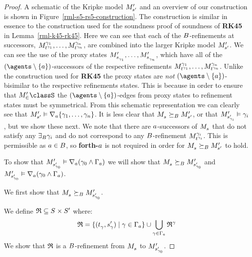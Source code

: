 \begin{proof}
A schematic of the Kripke model $\kPModelP{\kStateSP}$ and an overview of our construction is shown in Figure~\ref{rml-s5-rs5-construction}.
The construction is similar in essence to the construction used for the soundness proof of soundness of {\bf RK45} in Lemma~\ref{rml-k45-rk45}.
Here we can see that each of the $\agentsB$-refinements at successors, $\kPModel[\gamma_1]{\kStateT[\gamma_1]}, \dots, \kPModel[\gamma_n]{\kStateT[\gamma_n]}$, are combined into the larger Kripke model $\kPModelP{\kStateSP}$.
We can see the use of the proxy states $\kPModelP{\kStateS_{\gamma_1}}, \dots, \kPModelP{\kStateS_{\gamma_n}}$, which have all of the $(\agents \setminus \{\agentA\})$-successors of the respective refinements $\kPModel[\gamma_1]{\kStateT[\gamma_1]}, \dots, \kPModel[\gamma_n]{\kStateT[\gamma_n]}$.
Unlike the construction used for {\bf RK45} the proxy states are {\em not} $(\agents \setminus \{\agentA\})$-bisimilar to the respective refinements states.
This is because in order to ensure that $\kPModelP \in \classS$ the $(\agents \setminus \{\agentA\})$-edges from proxy states to refinement states must be symmetrical.
From this schematic representation we can clearly see that $\kPModelP{\kStateSP} \entails \coversA \{\gamma_1, \dots, \gamma_n\}$.
It is less clear that $\kPModel{\kStateS} \simulatesBs \kPModelP{\kStateSP}$, or that $\kPModelP{\kStateSP_{\gamma_i}} \entails \gamma_i$, but we show these next.
We note that there are $\agentA$-successors of $\kPModel{\kStateS}$ that do not satisfy any $\somerefsBs \gamma_i$ and do not correspond to any $\agentsB$-refinement $\kPModel[\gamma_i]{\kStateT[\gamma_i]}$.
This is permissible as $\agentA \in \agentsB$, so {\bf forth-$\agentA$} is not required in order for $\kPModel{\kStateS} \simulatesBs \kPModelP{\kStateSP}$ to hold.

To show that $\kPModelP{\kStateSP_{\gamma_0}} \entails \coversA (\gamma_0 \land \Gamma_\agentA)$ we will show that $\kPModel{\kStateS} \simulatesBs \kPModelP{\kStateSP_{\gamma_0}}$ and $\kPModelP{\kStateSP_{\gamma_0}} \entails \coversA (\gamma_0 \land \Gamma_\agentA)$.

We first show that $\kPModel{\kStateS} \simulatesBs \kPModelP{\kStateSP_{\gamma_0}}$.

We define $\refinement \subseteq \kStates \times \kStatesP$ where:
$$
\refinement = \{(\kStateT_\gamma, \kStateSP_\gamma) \mid \gamma \in \Gamma_\agentA\} \cup \bigcup_{\gamma \in \Gamma_\agentA} \refinement^\gamma
$$
We show that $\refinement$ is a $\agentsB$-refinement from $\kPModel{\kStateS}$ to $\kPModelP{\kStateSP_{\gamma_0}}$.


\end{proof}
